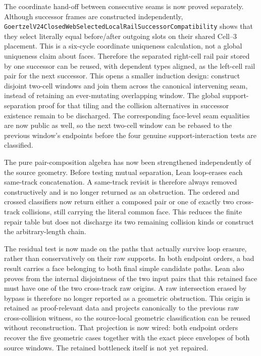 \documentclass[11pt]{article}
\theoremstyle{definition}
\begin{document}
The coordinate hand-off between consecutive seams is now proved separately.
Although successor frames are constructed independently,
\texttt{GoertzelV24ClosedWebSelectedLocalRailSuccessorCompatibility} shows
that they select literally equal before/after outgoing slots on their shared
Cell--3 placement.  This is a six-cycle coordinate uniqueness calculation,
not a global uniqueness claim about faces.  Therefore the separated
right-cell rail pair stored by one successor can be reused, with dependent
types aligned, as the left-cell rail pair for the next successor.  This opens
a smaller induction design: construct disjoint two-cell windows and join them
across the canonical intervening seam, instead of retaining an ever-mutating
overlapping window.  The global support-separation proof for that tiling and
the collision alternatives in successor existence remain to be discharged.
The corresponding face-level seam equalities are now public as well, so the
next two-cell window can be rebased to the previous window's endpoints before
the four genuine support-interaction tests are classified.

The pure pair-composition algebra has now been strengthened independently of
the source geometry.  Before testing mutual separation, Lean loop-erases each
same-track concatenation.  A same-track revisit is therefore always removed
constructively and is no longer returned as an obstruction.  The ordered and
crossed classifiers now return either a composed pair or one of exactly two
cross-track collisions, still carrying the literal common face.  This reduces
the finite repair table but does not discharge its two remaining collision
kinds or construct the arbitrary-length chain.

The residual test is now made on the paths that actually survive loop
erasure, rather than conservatively on their raw supports.  In both endpoint
orders, a bad result carries a face belonging to both final simple candidate
paths.  Lean also proves from the internal disjointness of the two input pairs
that this retained face must have one of the two cross-track raw origins.  A
raw intersection erased by bypass is therefore no longer reported as a
geometric obstruction.  This origin is retained as proof-relevant data and
projects canonically to the previous raw cross-collision witness, so the
source-local geometric classification can be reused without reconstruction.
That projection is now wired: both endpoint orders recover the five geometric
cases together with the exact piece envelopes of both source windows.
The retained bottleneck itself is not yet repaired.
\end{document}
